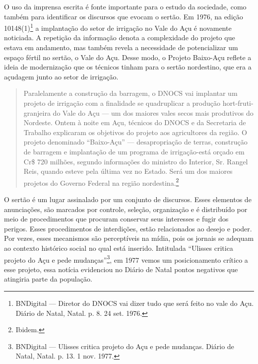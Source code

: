 \begin{refsection}
    O uso da imprensa escrita é fonte importante para o estudo da sociedade, como também para identificar os discursos que evocam o sertão. Em 1976, na edição 10148(1)\footnote{BNDigital --- Diretor do DNOCS vai dizer tudo que será feito no vale do Açu. Diário de Natal, Natal. p. 8. 24 set. 1976.} a implantação do setor de irrigação no Vale do Açu é novamente noticiada. A repetição da informação denota a complexidade do projeto que estava em andamento, mas também revela a necessidade de potencializar um espaço fértil no sertão, o Vale do Açu. Desse modo, o Projeto Baixo-Açu reflete a ideia de modernização que os técnicos tinham para o sertão nordestino, que era a açudagem junto ao setor de irrigação. 

    \begin{quotation}
        Paralelamente a construção da barragem, o DNOCS vai implantar um projeto de irrigação com a finalidade se quadruplicar a produção hort-fruti-granjeira do Vale do Açu --- um dos maiores vales secos mais produtivos do Nordeste. Ontem à noite em Açu, técnicos do DNOCS e da Secretaria de Trabalho explicaram os objetivos do projeto aos agricultores da região. O projeto denominado ``Baixo-Açu'' --- desapropriação de terras, construção de barragem e implantação de um programa de irrigação-está orçado em Cr\$ 720 milhões, segundo informações do ministro do Interior, Sr. Rangel Reis, quando esteve pela última vez no Estado. Será um dos maiores projetos do Governo Federal na região nordestina.\footnote{Ibidem.}
    \end{quotation}

    O sertão é um lugar assinalado por um conjunto de discursos. Esses elementos de anunciações, são marcados por controle, seleção, organização e é distribuído por meio de procedimentos que procuram conservar seus interesses e fugir dos perigos. Esses procedimentos de interdições, estão relacionados ao desejo e poder. Por vezes, esses mecanismos são perceptíveis na mídia, pois os jornais se adequam ao contexto histórico social no qual está inserido. Intitulada ``Ulisses critica projeto do Açu e pede mudanças''\footnote{BNDigital --- Ulisses critica projeto do Açu e pede mudanças. Diário de Natal, Natal. p. 13. 1 nov. 1977. }, em 1977 vemos um posicionamento crítico a esse projeto, essa notícia evidenciou no Diário de Natal pontos negativos que atingiria parte da população.  


\end{refsection}

